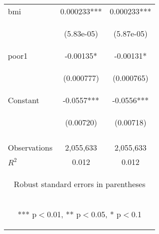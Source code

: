 \documentclass[]{article}
\begin{document}
\begin{center}
\begin{tabular}{lcc}
bmi & 0.000233*** & 0.000233*** \\
\vspace{4pt} & \begin{footnotesize}(5.83e-05)\end{footnotesize} & \begin{footnotesize}(5.87e-05)\end{footnotesize} \\
poor1 & -0.00135* & -0.00131* \\
\vspace{4pt} & \begin{footnotesize}(0.000777)\end{footnotesize} & \begin{footnotesize}(0.000765)\end{footnotesize} \\
Constant & -0.0557*** & -0.0556*** \\
 & \begin{footnotesize}(0.00720)\end{footnotesize} & \begin{footnotesize}(0.00718)\end{footnotesize} \\
\vspace{4pt} & \begin{footnotesize}\end{footnotesize} & \begin{footnotesize}\end{footnotesize} \\
Observations & 2,055,633 & 2,055,633 \\
 $R^2$ & 0.012 & 0.012 \\ \hline
\multicolumn{3}{c}{\begin{footnotesize} Robust standard errors in parentheses\end{footnotesize}} \\
\multicolumn{3}{c}{\begin{footnotesize} *** p$<$0.01, ** p$<$0.05, * p$<$0.1\end{footnotesize}} \\
\end{tabular}
\end{center}
\end{document}
